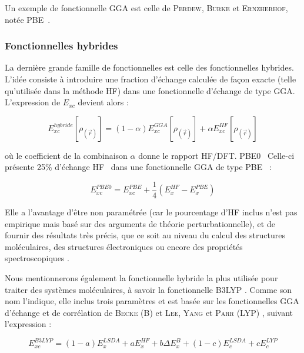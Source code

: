 Un exemple de fonctionnelle GGA est celle de \textsc{Perdew}, \textsc{Burke} et \textsc{Ernzherhof}, notée PBE~\cite{perdew1996generalized}.

\subsubsection{Fonctionnelles hybrides}

La dernière grande famille de fonctionnelles est celle des fonctionnelles hybrides. L’idée consiste à introduire une fraction d’échange calculée de façon exacte (telle qu’utilisée dans la méthode HF) dans une fonctionnelle d’échange de type GGA. L’expression de $E_{xc}$ devient alors :

\begin{equation}
E_{xc}^{hybride}[\rho_{(\vec{r})}] = (1- \alpha) E_{xc}^{GGA}[\rho_{(\vec{r})}] + \alpha E_{xc}^{HF}[\rho_{(\vec{r})}]
\end{equation}

\noindent où le coefficient de la combinaison $\alpha$ donne le rapport HF/DFT.
PBE0~\cite{adamo1999toward} Celle-ci présente 25\% d’échange HF~\cite{adamo1997toward} dans une fonctionnelle GGA de type PBE~\cite{perdew1996generalized} :

\begin{equation}
E_{xc}^{PBE0} = E_{xc}^{PBE} + \frac{1}{4} (E_{x}^{HF} - E_{x}^{PBE})
\end{equation}

Elle a l’avantage d’être non paramétrée (car le pourcentage d’HF inclus n’est pas empirique mais basé sur des arguments de théorie perturbationnelle), et de fournir des résultats très précis, que ce soit au niveau du calcul des structures moléculaires, des structures électroniques ou encore des propriétés spectroscopiques \cite{adamo1999toward}.

Nous mentionnerons également la fonctionnelle hybride la plus utilisée pour traiter des systèmes moléculaires, à savoir la fonctionnelle B3LYP \cite{becke1993density}. Comme son nom l’indique, elle inclus trois paramètres et est basée sur les fonctionnelles GGA d’échange et de corrélation de \textsc{Becke} (B) \cite{becke1988density} et \textsc{Lee}, \textsc{Yang} et \textsc{Parr} (LYP) \cite{chengteh1988development}, suivant l’expression :

\begin{equation}
E_{xc}^{B3LYP} = (1-a) E_{x}^{LSDA} + a E_{x}^{HF} + b \Delta E_{x}^{B} + (1-c) E_{c}^{LSDA} + c E_{c}^{LYP}
\label{B3LYP}
\end{equation}

